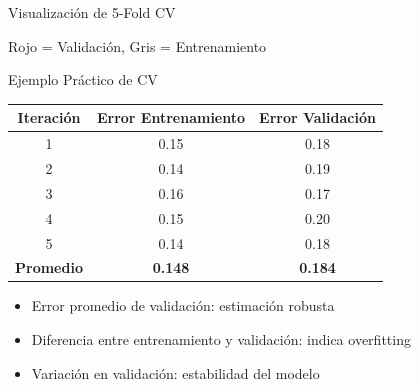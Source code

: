 \documentclass{beamer}
\begin{document}
\begin{frame}{Visualización de 5-Fold CV}
    \begin{center}
    \end{center}

    \begin{center}
        \small Rojo = Validación, Gris = Entrenamiento
    \end{center}
\end{frame}

\begin{frame}{Ejemplo Práctico de CV}
    \begin{center}
        \begin{tabular}{|c|c|c|}
        \hline
        \textbf{Iteración} & \textbf{Error Entrenamiento} & \textbf{Error Validación} \\
        \hline
        1 & 0.15 & 0.18 \\
        2 & 0.14 & 0.19 \\
        3 & 0.16 & 0.17 \\
        4 & 0.15 & 0.20 \\
        5 & 0.14 & 0.18 \\
        \hline
        \textbf{Promedio} & \textbf{0.148} & \textbf{0.184} \\
        \hline
        \end{tabular}
    \end{center}
    
    \vspace{1em}
    
    \begin{itemize}
        \item Error promedio de validación: estimación robusta
        \item Diferencia entre entrenamiento y validación: indica overfitting
        \item Variación en validación: estabilidad del modelo
    \end{itemize}
\end{frame}
\end{document}

